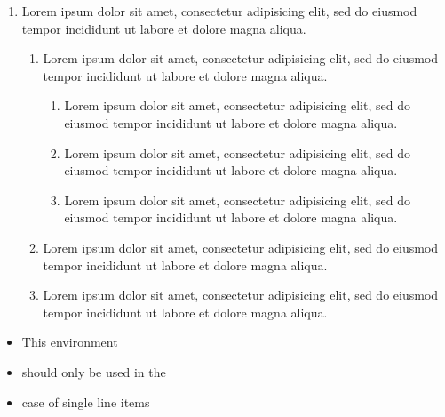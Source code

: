 \begin{filecontents*}{\democodefile}
\begin{enumerate}
   \item Lorem ipsum dolor sit amet, consectetur adipisicing elit, sed do eiusmod tempor incididunt ut labore et dolore magna aliqua.
%
   \begin{enumerate}
      \item Lorem ipsum dolor sit amet, consectetur adipisicing elit, sed do eiusmod tempor incididunt ut labore et dolore magna aliqua.
      \begin{enumerate}
         \item Lorem ipsum dolor sit amet, consectetur adipisicing elit, sed
         do eiusmod tempor incididunt ut labore et dolore magna aliqua.
         \item Lorem ipsum dolor sit amet, consectetur adipisicing elit, sed
         do eiusmod tempor incididunt ut labore et dolore magna aliqua.
         \item Lorem ipsum dolor sit amet, consectetur adipisicing elit, sed
         do eiusmod tempor incididunt ut labore et dolore magna aliqua.
      \end{enumerate}
      \item Lorem ipsum dolor sit amet, consectetur adipisicing elit, sed do
      eiusmod tempor incididunt ut labore et dolore magna aliqua.
      \item Lorem ipsum dolor sit amet, consectetur adipisicing elit, sed do
      eiusmod tempor incididunt ut labore et dolore magna aliqua.
   \end{enumerate}
\end{enumerate}
\end{filecontents*}



\begin{filecontents*}{\democodefile}
\begin{itemize}[noitemsep]
  \item This environment
  \item should only be used in the
  \item case of single line items
\end{itemize}
\end{filecontents*}

%
